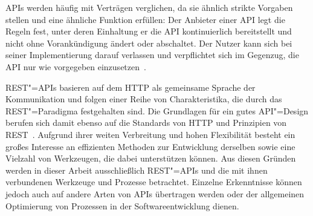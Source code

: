 \acp{API} werden häufig mit Verträgen verglichen, da sie ähnlich strikte Vorgaben stellen und eine ähnliche Funktion erfüllen:
Der Anbieter einer \ac{API} legt die Regeln fest, unter deren Einhaltung er die \ac{API} kontinuierlich bereitstellt und nicht ohne Vorankündigung ändert oder abschaltet.
Der Nutzer kann sich bei seiner Implementierung darauf verlassen und verpflichtet sich im Gegenzug, die \ac{API} nur wie vorgegeben einzusetzen~\cites{ope23a}[1627]{cha21}.

\acs{REST}"=\acp{API} basieren auf dem \acf{HTTP} als gemeinsame Sprache der Kommunikation und folgen einer Reihe von Charakteristika, die durch das \ac{REST}"=Paradigma festgehalten sind.
Die Grundlagen für ein gutes \ac{API}"=Design berufen sich damit ebenso auf die Standards von \ac{HTTP} und Prinzipien von \ac{REST}~\cite[1628]{cha21}.
Aufgrund ihrer weiten Verbreitung und hohen Flexibilität besteht ein großes Interesse an effizienten Methoden zur Entwicklung derselben sowie eine Vielzahl von Werkzeugen, die dabei unterstützen können.
Aus diesen Gründen werden in dieser Arbeit ausschließlich \acs{REST}"=\acp{API} und die mit ihnen verbundenen Werkzeuge und Prozesse betrachtet.
Einzelne Erkenntnisse können jedoch auch auf andere Arten von \acp{API} übertragen werden oder der allgemeinen Optimierung von Prozessen in der Softwareentwicklung dienen.